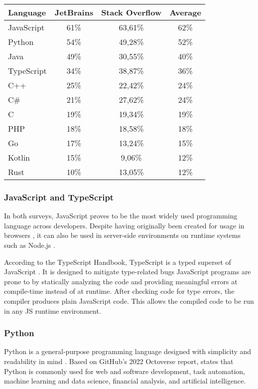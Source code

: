 \begin{center}
    
\begin{tabular}{| l| c c c |}
\hline
Language   & JetBrains & Stack Overflow & Average \\
\hline
JavaScript & 61\%      & 63,61\%        & 62\%    \\
Python     & 54\%      & 49,28\%        & 52\%    \\
Java       & 49\%      & 30,55\%        & 40\%    \\
TypeScript & 34\%      & 38,87\%        & 36\%    \\
C++        & 25\%      & 22,42\%        & 24\%    \\
C\#        & 21\%      & 27,62\%        & 24\%    \\
C          & 19\%      & 19,34\%        & 19\%    \\
PHP        & 18\%      & 18,58\%        & 18\%    \\
Go         & 17\%      & 13,24\%        & 15\%    \\
Kotlin     & 15\%      & 9,06\%         & 12\%    \\
Rust       & 10\%      & 13,05\%        & 12\%    \\
\hline
\end{tabular}
\end{center}


\subsubsection{JavaScript and TypeScript}
In both surveys, JavaScript proves to be the most widely used programming language across developers. Despite having originally been created for usage in browsers \autocite{NCC1995}, it can also be used in server-side environments on runtime systems such as Node.js \autocite{OpenJSFoundation}.

According to the TypeScript Handbook, TypeScript is a typed superset of JavaScript \autocite{TypeScript2023}. It is designed to mitigate type-related bugs JavaScript programs are prone to by statically analyzing the code and providing meaningful errors at compile-time instead of at runtime. After checking code for type errors, the compiler produces plain JavaScript code. This allows the compiled code to be run in any JS runtime environment.

\subsubsection{Python}
Python is a general-purpose programming language designed with simplicity and readability in mind \autocite{Peters2004}. Based on GitHub's 2022 Octoverse report, \textcite{Scarlett2023} states that Python is commonly used for web and software development, task automation, machine learning and data science, financial analysis, and artificial intelligence.

